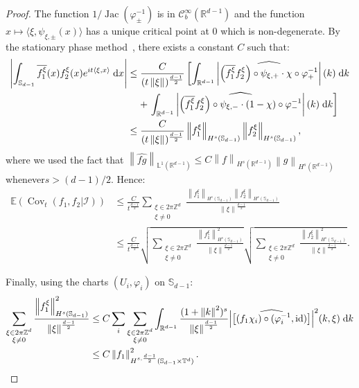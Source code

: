 \documentclass[10pt]{amsart}
\theoremstyle{definition}\newtheorem{defi}[theo]{Definition}\newtheorem{rema}[theo]{Remark}\newtheorem{exam}[theo]{Example}\newtheorem{exem}[theo]{Example}\newtheorem{nota}[theo]{Notation}
\DeclareMathOperator{\id}{id}
\DeclareMathOperator{\Cov}{Cov}
\DeclareMathOperator{\Jac}{Jac}
\newcommand{\Z}{\mathbb{Z}}
\newcommand{\R}{\mathbb{R}}
\newcommand{\Ebb}{\mathbb{E}}
\newcommand{\Lbb}{\mathbb{L}}
\newcommand{\Sbb}{\mathbb{S}}
\newcommand{\Tbb}{\mathbb{T}}
\newcommand{\Ccal}{\mathcal{C}}
\newcommand{\Ical}{\mathcal{I}}
\newcommand{\dd}{\;{\rm d}}
\newcommand{\norm}[2]{\left\| #1 \right\|_{#2}}
\begin{document}
\begin{proof}
The function $1/\Jac (\varphi_\pm^{-1})$ is in $\Ccal_b^\infty (\R^{d-1})$ and the function $x \mapsto \langle \xi, \psi_{\xi,\pm} (x) \rangle$ has a unique critical point at $0$ which is non-degenerate. By the stationary phase method~\cite[Chapter~7.7]{Hormander:1983}, there exists a constant $C$ such that:
\begin{align*}
\left| \int_{\Sbb_{d-1}} \overline{f_1^\xi} (x) f_2^\xi (x) e^{i t \langle \xi, x \rangle} \dd x \right| & \leq \frac{C}{(t \norm{\xi}{})^{\frac{d-1}{2}}} \left[\int_{\R^{d-1}} \left| \widehat{ \left(\overline{f_1^\xi} f_2^\xi\right) \circ \psi_{\xi, +} \cdot \chi \circ \varphi_+^{-1}} \right| (k) \dd k \right. \\
& \mkern 20mu + \left. \int_{\R^{d-1}} \left| \widehat{ \left(\overline{f_1^\xi} f_2^\xi\right) \circ \psi_{\xi, -} \cdot (1-\chi) \circ \varphi_-^{-1} } \right| (k) \dd k \right] \\
& \leq \frac{C}{(t \norm{\xi}{})^{\frac{d-1}{2}}} \norm{f_1^\xi}{H^s (\Sbb_{d-1})} \norm{f_2^\xi}{H^s (\Sbb_{d-1})},
\end{align*}
where we used the fact that $\norm{\widehat{fg}}{\Lbb^1 (\R^{d-1})} \leq C \norm{f}{H^s (\R^{d-1})} \norm{g}{H^s (\R^{d-1})}$ whenever\linebreak$s > (d-1)/2$. Hence:
\begin{align*}
\Ebb (\Cov_t (f_1, f_2|\Ical)) & \leq \frac{C}{t^{\frac{d-1}{2}}} \sum_{\substack{\xi \in 2\pi\Z^d \\ \xi \neq 0}} \frac{\norm{f_1^\xi}{H^s (\Sbb_{d-1})} \norm{f_2^\xi}{H^s (\Sbb_{d-1})}}{\norm{\xi}{}^{\frac{d-1}{2}}} \\
& \leq \frac{C}{t^{\frac{d-1}{2}}} \sqrt{\sum_{\substack{\xi \in 2\pi\Z^d \\ \xi \neq 0}} \frac{\norm{f_1^\xi}{H^s (\Sbb_{d-1})}^2 }{\norm{\xi}{}^{\frac{d-1}{2}}}} \sqrt{\sum_{\substack{\xi \in 2\pi\Z^d \\ \xi \neq 0}} \frac{\norm{f_2^\xi}{H^s (\Sbb_{d-1})}^2}{\norm{\xi}{}^{\frac{d-1}{2}}}}.
\end{align*}

Finally, using the charts $(U_i, \varphi_i)$ on $\Sbb_{d-1}$:
\begin{align*}
\sum_{\substack{\xi \in 2\pi\Z^d \\ \xi \neq 0}} \frac{\norm{f_1^\xi}{H^s (\Sbb_{d-1})}^2 }{\norm{\xi}{}^{\frac{d-1}{2}}} & \leq C \sum_i \sum_{\substack{\xi \in 2\pi\Z^d \\ \xi \neq 0}} \int_{\R^{d-1}} \frac{(1+\norm{k}{}^2)^s}{\norm{\xi}{}^{\frac{d-1}{2}}} \Big|\widehat{\left[(f_1\chi_i) \circ (\varphi_i^{-1}, \id)\right]}\Big|^2 (k, \xi) \dd k \\
& \leq C \norm{f_1}{H^{s,\frac{d-1}{2}} (\Sbb_{d-1} \times \Tbb^d)}^2.
\end{align*}


\end{proof}
\end{document}
